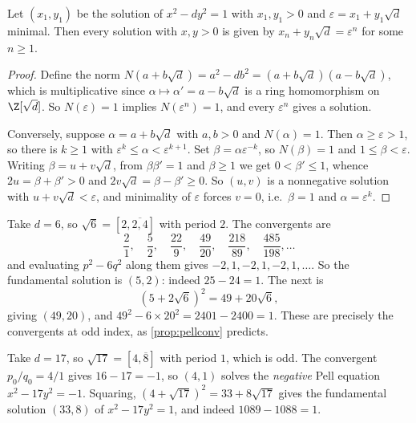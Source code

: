 \begin{theorem}\label{thm:pellgroup}
	Let $(x_1, y_1)$ be the solution of $x^2 - dy^2 = 1$ with $x_1, y_1 > 0$ and $\varepsilon = x_1 + y_1\sqrt d$ minimal. Then every solution with $x, y > 0$ is given by $x_n + y_n\sqrt d = \varepsilon^n$ for some $n \geq 1$.
\end{theorem}
\begin{proof}
	Define the norm $N(a + b\sqrt d) = a^2 - db^2 = (a+b\sqrt d)(a - b\sqrt d)$, which is multiplicative since $\alpha \mapsto \alpha' = a - b\sqrt d$ is a ring homomorphism on $\Z[\sqrt d]$. So $N(\varepsilon) = 1$ implies $N(\varepsilon^n) = 1$, and every $\varepsilon^n$ gives a solution.

	Conversely, suppose $\alpha = a + b\sqrt d$ with $a, b > 0$ and $N(\alpha) = 1$. Then $\alpha \geq \varepsilon > 1$, so there is $k \geq 1$ with $\varepsilon^k \leq \alpha < \varepsilon^{k+1}$. Set $\beta = \alpha\varepsilon^{-k}$, so $N(\beta) = 1$ and $1 \leq \beta < \varepsilon$. Writing $\beta = u + v\sqrt d$, from $\beta\beta' = 1$ and $\beta \geq 1$ we get $0 < \beta' \leq 1$, whence $2u = \beta + \beta' > 0$ and $2v\sqrt d = \beta - \beta' \geq 0$. So $(u,v)$ is a nonnegative solution with $u + v\sqrt d < \varepsilon$, and minimality of $\varepsilon$ forces $v = 0$, i.e.\ $\beta = 1$ and $\alpha = \varepsilon^k$.
\end{proof}

\begin{example}
	Take $d = 6$, so $\sqrt6 = [2, \overline{2,4}]$ with period $2$. The convergents are
	$$
	\frac21, \quad \frac52, \quad \frac{22}9, \quad \frac{49}{20}, \quad \frac{218}{89}, \quad \frac{485}{198}, \dots
	$$
	and evaluating $p^2 - 6q^2$ along them gives $-2, 1, -2, 1, -2, 1, \dots$. So the fundamental solution is $(5, 2)$: indeed $25 - 24 = 1$. The next is
	$$
	(5 + 2\sqrt6)^2 = 49 + 20\sqrt6,
	$$
	giving $(49, 20)$, and $49^2 - 6\times20^2 = 2401 - 2400 = 1$. These are precisely the convergents at odd index, as \autoref{prop:pellconv} predicts.
\end{example}

\begin{example}
	Take $d = 17$, so $\sqrt{17} = [4, \overline 8]$ with period $1$, which is odd. The convergent $p_0/q_0 = 4/1$ gives $16 - 17 = -1$, so $(4,1)$ solves the \emph{negative} Pell equation $x^2 - 17y^2 = -1$. Squaring, $(4+\sqrt{17})^2 = 33 + 8\sqrt{17}$ gives the fundamental solution $(33, 8)$ of $x^2 - 17y^2 = 1$, and indeed $1089 - 1088 = 1$.
\end{example}

